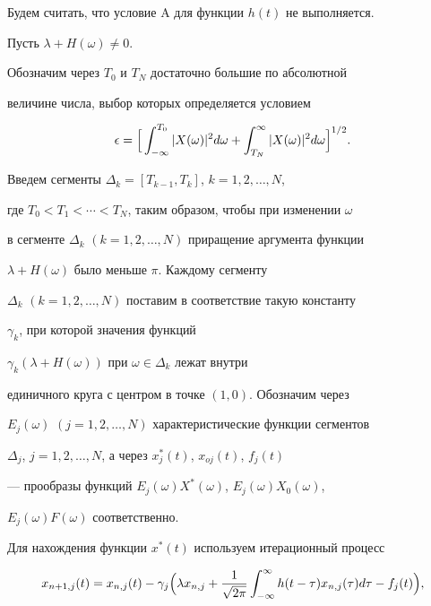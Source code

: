 Будем считать, что условие A для функции $h(t)$ не выполняется.


Пусть $\lambda+H(\omega)\ne 0$.


Обозначим через $T_0$ и $T_N$ достаточно большие по абсолютной


величине числа, выбор которых определяется условием


$$


\epsilon=\Bigl[\,\int_{-\infty}^{T_0}|X(\omega)


|^2 d\omega +\int_{T_N}^\infty


|X(\omega)|^2 d\omega\Bigr]^{1/2}.


$$





Введем сегменты $\Delta_k=[T_{k-1},T_k]$, $k=1,2,\dotsc,N$,


где $T_0<T_1<\dotsb<T_N$, таким образом, чтобы при изменении $\omega$


в сегменте $\Delta_k$ $(k=1,2,\dotsc,N)$ приращение аргумента функции


$\lambda+H(\omega)$ было меньше $\pi$. Каждому сегменту


$\Delta_k$ $(k=1,2,\dotsc,N)$ поставим в соответствие такую константу


$\gamma_k$, при которой значения функций


$\gamma_k (\lambda+H(\omega)) $ при $\omega\in\Delta_k $ лежат внутри


единичного круга с центром в точке $(1,0)$. Обозначим через


$E_j (\omega)$ $(j=1,2,\dotsc,N)$ характеристические функции сегментов


$\Delta_j$, $j=1,2,\dotsc,N$, а через $x_j^* (t)$, $x_{oj} (t)$, $f_j(t)$


--- прообразы функций $E_j (\omega) X^*(\omega)$, $E_j (\omega) X_0(\omega)$,


$E_j (\omega) F(\omega)$ соответственно.





Для нахождения функции $x^* (t)$ используем итерационный процесс


\begin{equation}


x_{n+1,j}(t)=x_{n,j}(t)-\gamma_j\Bigl(\lambda


x_{n,j}+\frac{1}{\sqrt{2\pi}}


\int_{-\infty}^\infty h(t-\tau) x_{n,j}(\tau) d\tau-f_j(t)\Bigr),


\end{equation}


